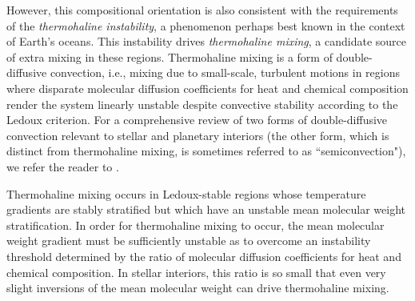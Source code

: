 
However, this compositional orientation is also consistent with the requirements of the \textit{thermohaline instability}, a phenomenon perhaps best known in the context of Earth's oceans. 
%
This instability drives \textit{thermohaline mixing}, a candidate source of extra mixing in these regions. Thermohaline mixing is a form of double-diffusive convection, i.e., mixing due to small-scale, turbulent motions in regions where disparate molecular diffusion coefficients for heat and chemical composition render 
the system linearly unstable despite %
convective stability according to the Ledoux criterion. For a comprehensive review of two forms of double-diffusive convection relevant to stellar and planetary interiors (the other form, which is distinct from thermohaline mixing, is sometimes referred to as ``semiconvection"), %
we refer the reader to \citet{garaud_DDC_review_2018}. 

Thermohaline mixing occurs in Ledoux-stable regions whose temperature gradients are stably stratified but which have an unstable mean molecular weight stratification. %
In order for thermohaline mixing to occur, the mean molecular weight gradient must be sufficiently unstable as to overcome an instability threshold determined by the ratio of molecular diffusion coefficients for heat and chemical composition. 
In stellar interiors, this ratio is so small that even very slight inversions of the mean molecular weight can drive thermohaline mixing.


